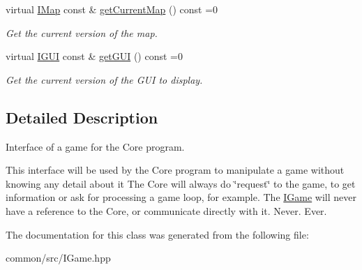 \begin{DoxyCompactItemize}
\mbox{\label{classarcade_1_1IGame_a2e1791071bf65ee35e249e409ee29044}} 
virtual \hyperlink{classarcade_1_1IMap}{I\+Map} const  \& \hyperlink{classarcade_1_1IGame_a2e1791071bf65ee35e249e409ee29044}{get\+Current\+Map} () const =0
\begin{DoxyCompactList}\small\item\em Get the current version of the map. \end{DoxyCompactList}\item 
\mbox{\label{classarcade_1_1IGame_a577815e0d2c32808bcce406dde414b9d}} 
virtual \hyperlink{classarcade_1_1IGUI}{I\+G\+UI} const  \& \hyperlink{classarcade_1_1IGame_a577815e0d2c32808bcce406dde414b9d}{get\+G\+UI} () const =0
\begin{DoxyCompactList}\small\item\em Get the current version of the G\+UI to display. \end{DoxyCompactList}\end{DoxyCompactItemize}


\subsection{Detailed Description}
Interface of a game for the Core program. 

This interface will be used by the Core program to manipulate a game without knowing any detail about it The Core will always do \char`\"{}request\char`\"{} to the game, to get information or ask for processing a game loop, for example. The \hyperlink{classarcade_1_1IGame}{I\+Game} will never have a reference to the Core, or communicate directly with it. Never. Ever. 

The documentation for this class was generated from the following file\+:\begin{DoxyCompactItemize}
\item 
common/src/I\+Game.\+hpp\end{DoxyCompactItemize}
